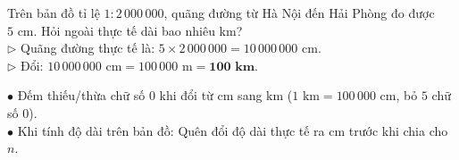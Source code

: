 \documentclass[14pt,a4paper,oneside]{extbook}
\begin{document}
\vspace{3mm}

\noindent
\begin{minipage}[t]{0.54\textwidth}
  \begin{tcolorbox}[
    enhanced,
    title={\footnotesize\bfseries\color{white}\faLightbulbO\ Ví dụ mẫu giải chi tiết},
    colback=green!3!white,
    colframe=green!60!black,
    arc=2.5mm, boxrule=0.8pt, top=1.8mm, bottom=1.8mm, left=2.2mm, right=2.2mm
  ]
    \footnotesize
    Trên bản đồ tỉ lệ $1 : 2\,000\,000$, quãng đường từ Hà Nội đến Hải Phòng đo được $5\text{ cm}$. Hỏi ngoài thực tế dài bao nhiêu km?\\
    $\triangleright$ Quãng đường thực tế là: $5 \times 2\,000\,000 = 10\,000\,000\text{ cm}$.\\
    $\triangleright$ Đổi: $10\,000\,000\text{ cm} = 100\,000\text{ m} = \mathbf{100\text{ km}}$.
  \end{tcolorbox}
\end{minipage}%
\hfill
\begin{minipage}[t]{0.44\textwidth}
  \begin{tcolorbox}[
    enhanced,
    title={\footnotesize\bfseries\color{white}\faExclamationTriangle\ Mẹo tránh bẫy trắc nghiệm},
    colback=red!2!white,
    colframe=red!70!black,
    arc=2.5mm, boxrule=0.8pt, top=1.8mm, bottom=1.8mm, left=2.2mm, right=2.2mm
  ]
    \footnotesize
    $\bullet$ Đếm thiếu/thừa chữ số $0$ khi đổi từ $\text{cm}$ sang $\text{km}$ ($1\text{ km} = 100\,000\text{ cm}$, bỏ $5$ chữ số $0$).\\
    $\bullet$ Khi tính độ dài trên bản đồ: Quên đổi độ dài thực tế ra $\text{cm}$ trước khi chia cho $n$.
  \end{tcolorbox}
\end{minipage}
\end{document}

